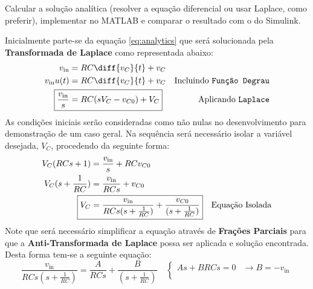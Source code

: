 \documentclass{article}
\begin{document}
\newpage
            \begin{exercise}
                Calcular a solução analítica (resolver a equação diferencial ou usar Laplace, como preferir), implementar no MATLAB e comparar o resultado com o do Simulink.
            \end{exercise}
            \begin{resolution}
                Inicialmente parte-se da equação \ref{eq:analytics} que será solucionada pela \textbf{Transformada de Laplace} como representada abaixo:
                    \begin{align}
                        v_{\text{in}}           &= RC\diff{v_{C}}{t} + v_{C}\nonumber\\
                        v_{\text{in}}u(t)       &= RC\diff{v_{C}}{t} + v_{C} & \text{Incluindo \texttt{Função Degrau}}\nonumber\\
                        \Aboxed{
                            \frac{v_{\text{in}}}{s} &= RC(sV_{C} - v_{C0}) + V_{C}
                        } & \text{Aplicando \texttt{Laplace}}
                    \end{align}
                As condições iniciais serão consideradas como não nulas no desenvolvimento para demonstração de um caso geral. Na sequência será necessário isolar a variável desejada, $V_{C}$, procedendo da seguinte forma:
                    \begin{align}
                        V_{C}(RCs + 1)          &= \frac{v_{\text{in}}}{s} + RCv_{C0}\nonumber\\
                        V_{C}(s + \frac{1}{RC}) &= \frac{v_{\text{in}}}{RCs} + v_{C0}\nonumber\\
                        \Aboxed{
                            V_{C}                   &= \frac{v_{\text{in}}}{RCs(s + \frac{1}{RC})} + \frac{v_{C0}}{(s + \frac{1}{RC})}
                        } & \text{Equação Isolada}
                    \end{align}
                Note que será necessário simplificar a equação através de \textbf{Frações Parciais} para que a \textbf{Anti-Transformada de Laplace} possa ser aplicada e solução encontrada. Desta forma tem-se a seguinte equação:
                    \begin{equation*}
                        \frac{v_{\text{in}}}{RCs(s + \frac{1}{RC})} = 
                        \frac{A}{RCs} + \frac{B}{(s + \frac{1}{RC})}
                        \quad
                        \begin{cases}
                            As + BRCs = 0                & \rightarrow \boxed{B =  -v_{\text{in}}}\\[2.5mm]

\end{cases}
\end{equation*}
\end{resolution}
\end{document}
